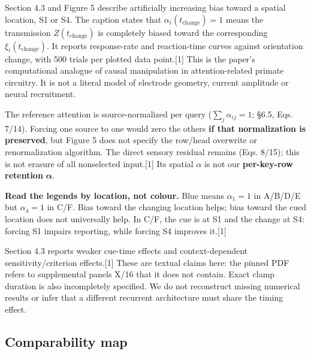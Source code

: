 \documentclass[
  10pt,
]{article}
\begin{document}
Section 4.3 and Figure 5 describe artificially increasing bias toward a
spatial location, S1 or S4. The caption states that
\(\alpha_i(t_{\mathrm{change}})=1\) means the transmission
\(Z(t_{\mathrm{change}})\) is completely biased toward the corresponding
\(\xi_i(t_{\mathrm{change}})\). It reports response-rate and
reaction-time curves against orientation change, with 500 trials per
plotted data point.{[}1{]} This is the paper's computational analogue of
causal manipulation in attention-related primate circuitry. It is not a
literal model of electrode geometry, current amplitude or neural
recruitment.

The reference attention is source-normalized per query
(\(\sum_j\alpha_{ij}=1\); §6.5, Eqs. 7/14). Forcing one source to one
would zero the others \textbf{if that normalization is preserved}, but
Figure 5 does not specify the row/head overwrite or renormalization
algorithm. The direct sensory residual remains (Eqs. 8/15); this is not
erasure of all nonselected input.{[}1{]} Its spatial \(\alpha\) is not
our \textbf{per-key-row retention} \(\boldsymbol\alpha\).

\textbf{Read the legends by location, not colour.} Blue means
\(\alpha_1=1\) in A/B/D/E but \(\alpha_4=1\) in C/F. Bias toward the
changing location helps; bias toward the cued location does not
universally help. In C/F, the cue is at S1 and the change at S4: forcing
S1 impairs reporting, while forcing S4 improves it.{[}1{]}

Section 4.3 reports weaker cue-time effects and context-dependent
sensitivity/criterion effects.{[}1{]} These are textual claims here: the
pinned PDF refers to supplemental panels X/16 that it does not contain.
Exact clamp duration is also incompletely specified. We do not
reconstruct missing numerical results or infer that a different
recurrent architecture must share the timing effect.

\subsection{Comparability map}\label{comparability-map}
\end{document}
